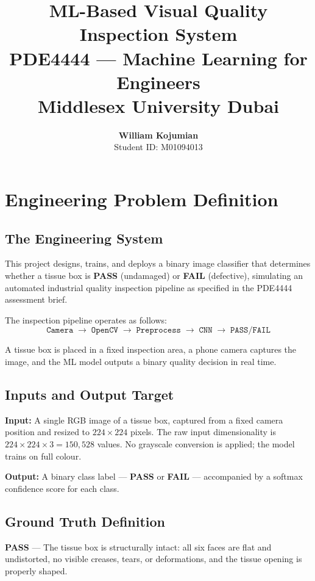 \documentclass[10pt,twocolumn]{article}
\title{
  \vspace{-1.5em}
  {\large \textbf{ML-Based Visual Quality Inspection System}} \\[2pt]
  {\normalsize PDE4444 --- Machine Learning for Engineers} \\[2pt]
  {\small Middlesex University Dubai}
}
\author{\textbf{William Kojumian} \\ \small Student ID: M01094013}
\date{}
\begin{document}
\maketitle
\vspace{-1.5em}

\section{Engineering Problem Definition}

\subsection*{The Engineering System}

This project designs, trains, and deploys a binary image classifier that determines whether a tissue box is \textbf{PASS} (undamaged) or \textbf{FAIL} (defective), simulating an automated industrial quality inspection pipeline as specified in the PDE4444 assessment brief.

The inspection pipeline operates as follows:
\[
\texttt{Camera} \;\to\; \texttt{OpenCV} \;\to\; \texttt{Preprocess} \;\to\; \texttt{CNN} \;\to\; \texttt{PASS/FAIL}
\]

A tissue box is placed in a fixed inspection area, a phone camera captures the image, and the ML model outputs a binary quality decision in real time.

\subsection*{Inputs and Output Target}

\textbf{Input:} A single RGB image of a tissue box, captured from a fixed camera position and resized to $224 \times 224$ pixels. The raw input dimensionality is $224 \times 224 \times 3 = 150{,}528$ values. No grayscale conversion is applied; the model trains on full colour.

\textbf{Output:} A binary class label --- \textbf{PASS} or \textbf{FAIL} --- accompanied by a softmax confidence score for each class.

\subsection*{Ground Truth Definition}

\textbf{PASS} --- The tissue box is structurally intact: all six faces are flat and undistorted, no visible creases, tears, or deformations, and the tissue opening is properly shaped.
\end{document}
